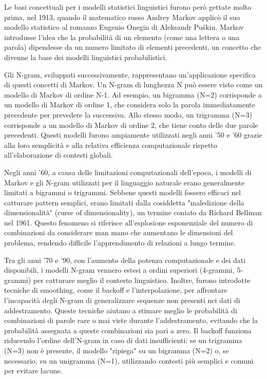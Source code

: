 \documentclass[target=mst,aauheader=,style=]{thud}
\begin{document}
Le basi concettuali per i modelli statistici linguistici furono però gettate molto prima, nel 1913, quando il matematico russo Andrey Markov applicò il suo modello statistico al romanzo Eugenio Onegin di Aleksandr Puškin. Markov introdusse l’idea che la probabilità di un elemento (come una lettera o una parola) dipendesse da un numero limitato di elementi precedenti, un concetto che divenne la base dei modelli linguistici probabilistici.

Gli N-gram, sviluppati successivamente, rappresentano un'applicazione specifica di questi concetti di Markov. Un N-gram di lunghezza N può essere visto come un modello di Markov di ordine N-1. Ad esempio, un bigramma (N=2) corrisponde a un modello di Markov di ordine 1, che considera solo la parola immediatamente precedente per prevedere la successiva. Allo stesso modo, un trigramma (N=3) corrisponde a un modello di Markov di ordine 2, che tiene conto delle due parole precedenti. Questi modelli furono ampiamente utilizzati negli anni ’50 e ’60 grazie alla loro semplicità e alla relativa efficienza computazionale rispetto all’elaborazione di contesti globali.

Negli anni '60, a causa delle limitazioni computazionali dell'epoca, i modelli di Markov e gli N-gram utilizzati per il linguaggio naturale erano generalmente limitati a bigrammi o trigrammi. Sebbene questi modelli fossero efficaci nel catturare pattern semplici, erano limitati dalla cosiddetta "maledizione della dimensionalità" (curse of dimensionality), un termine coniato da Richard Bellman nel 1961. Questo fenomeno si riferisce all'esplosione esponenziale del numero di combinazioni da considerare man mano che aumentano le dimensioni del problema, rendendo difficile l'apprendimento di relazioni a lungo termine.

Tra gli anni ’70 e ’90, con l’aumento della potenza computazionale e dei dati disponibili, i modelli N-gram vennero estesi a ordini superiori (4-grammi, 5-grammi) per catturare meglio il contesto linguistico. Inoltre, furono introdotte tecniche di smoothing, come il backoff e l’interpolazione, per affrontare l’incapacità degli N-gram di generalizzare sequenze non presenti nei dati di addestramento.
Queste tecniche aiutano a stimare meglio le probabilità di combinazioni di parole rare o mai viste durante l’addestramento, evitando che la probabilità assegnata a queste combinazioni sia pari a zero. Il backoff funziona riducendo l’ordine dell’N-gram in caso di dati insufficienti: se un trigramma (N=3) non è presente, il modello "ripiega" su un bigramma (N=2) o, se necessario, su un unigramma (N=1), utilizzando contesti più semplici e comuni per evitare lacune.
\end{document}
